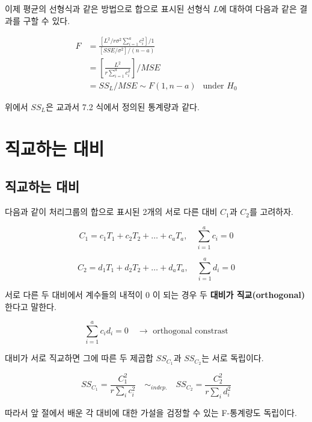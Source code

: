 \documentclass[
]{book}
\begin{document}
이제 평균의 선형식과 같은 방법으로 합으로 표시된 선형식 \(L\)에 대하여 다음과 같은 결과를 구할 수 있다.

\begin{align*}
F & = \frac{  \left [ L^2 / r \sigma^2 \sum_{i=1}^a c_i^2 \right ] /1} { \left [ SSE/ \sigma^2  \right ] / (n-a)} \\
& =  \left[ \frac{L^2}{r \sum_{i=1}^a c_i^2 } \right ] / MSE  \\
& = SS_L / MSE \sim F(1, n-a) ~~\text{ under } H_0
\end{align*}

위에서 \(SS_L\)은 교과서 7.2 식에서 정의된 통계량과 같다.

\hypertarget{orthogonal}{%
\chapter{직교하는 대비}\label{orthogonal}}

\hypertarget{uxc9c1uxad50uxd558uxb294-uxb300uxbe44}{%
\section{직교하는 대비}\label{uxc9c1uxad50uxd558uxb294-uxb300uxbe44}}

다음과 같이 처리그룹의 합으로 표시된 2개의 서로 다른 대비 \(C_1\)과 \(C_2\)를 고려하자.

\begin{equation}
C_1 = c_1 T_1 + c_2 T_2 + \dots + c_a T_a, \quad \sum_{i=1}^a c_i =0
\label{eq:contrast1}
\end{equation}

\begin{equation}
C_2 = d_1 T_1 + d_2 T_2 + \dots + d_a T_a, \quad \sum_{i=1}^a d_i =0
\label{eq:contrast2}
\end{equation}

서로 다른 두 대비에서 계수들의 내적이 0 이 되는 경우 두 \textbf{대비가 직교(orthogonal)}한다고 말한다.

\begin{equation}
 \sum_{i=1}^a c_i d_i =0 \quad \rightarrow \text{ orthogonal constrast}
\label{eq:ortho}
\end{equation}

대비가 서로 직교하면 그에 따른 두 제곱합 \(SS_{C_1}\)과 \(SS_{C_2}\)는 서로 독립이다.

\[ SS_{C_1} = \frac{C_1^2}{r\sum_i c_i^2 } \quad \sim_{indep.} \quad SS_{C_2} = \frac{C_2^2}{r\sum_i d_i^2 } \]

따라서 앞 절에서 배운 각 대비에 대한 가설을 검정할 수 있는 F-통계량도 독립이다.
\end{document}
